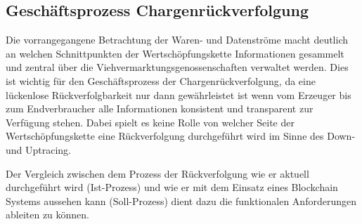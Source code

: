 
\subsection{Geschäftsprozess Chargenrückverfolgung}
Die vorrangegangene Betrachtung der Waren- und Datenströme macht deutlich an welchen Schnittpunkten der Wertschöpfungskette Informationen gesammelt und zentral über die Viehvermarktungsgenossenschaften verwaltet werden. Dies ist wichtig für den Geschäftsprozess der Chargenrückverfolgung, da eine lückenlose Rückverfolgbarkeit nur dann gewährleistet ist wenn vom Erzeuger bis zum Endverbraucher alle Informationen konsistent und transparent zur Verfügung stehen. Dabei spielt es keine Rolle von welcher Seite der Wertschöpfungskette eine Rückverfolgung durchgeführt wird im Sinne des Down- und Uptracing.

Der Vergleich zwischen dem Prozess der Rückverfolgung wie er aktuell durchgeführt wird (Ist-Prozess) und wie er mit dem Einsatz eines Blockchain Systems aussehen kann (Soll-Prozess) dient dazu die funktionalen Anforderungen ableiten zu können.

